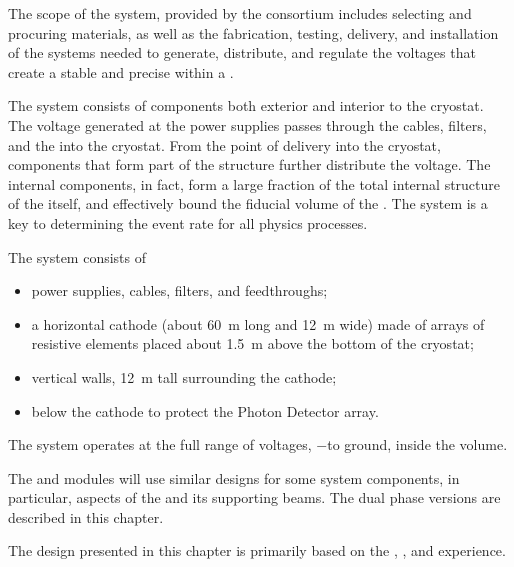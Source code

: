 The scope of the \dual {} system, provided by the   consortium includes selecting and procuring materials, as well as the fabrication, testing, delivery, and installation of the systems needed to generate, distribute, and regulate the voltages that
create a stable and precise \efield{} within a . 

The  system consists of components both exterior and interior to the cryostat. The voltage generated at the  power supplies passes through the cables, filters, and the  \fdth into the cryostat. From the point of delivery into the cryostat, components that form part of the  structure further distribute the voltage. The internal  components, in fact, form a large fraction of the total internal structure of the  itself, and  
 effectively bound the fiducial volume of the %
 . The  system is a key to determining the event rate for all  physics processes.

The  system consists of
\begin{itemize}
\item {} power supplies, cables, filters, and feedthroughs;
\item  a horizontal cathode (about \SI{60}{\m} long and \SI{12}{\m} wide) made of arrays of resistive elements placed about \SI{1.5}{\m} above the bottom of the cryostat;
\item vertical  walls, \SI{12}{\m} tall surrounding the cathode;
\item {} below the cathode to protect the Photon Detector array.
\end{itemize}

The system operates at the full range of voltages, %
$-$\dptargetdriftvoltpos to ground, inside the  volume. 

The \single and \dual modules will use similar designs for some
  system components, %
in particular, aspects of the  and its supporting beams. The dual phase versions are described in this chapter. 

The design presented in this chapter is primarily based on the , , and   experience. 


